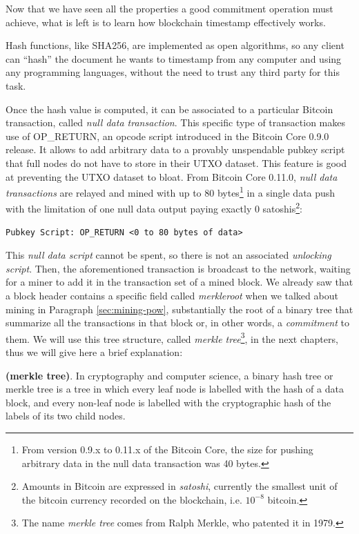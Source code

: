 \bigskip
\noindent
Now that we have seen all the properties a good commitment operation must achieve, what is left is to learn how blockchain timestamp effectively works.

\bigskip
\noindent
Hash functions, like SHA256, are implemented as open algorithms, so any client can \enquote{hash} the document he wants to timestamp from any computer and using any programming languages, without the need to trust any third party for this task.

\bigskip
\noindent
Once the hash value is computed, it can be associated to a particular Bitcoin transaction, called \textit{null data transaction}. This specific type of transaction makes use of OP\_RETURN, an opcode script introduced in the Bitcoin Core 0.9.0 release. It allows to add arbitrary data to a provably unspendable pubkey script that full nodes do not have to store in their UTXO dataset. This feature is good at preventing the UTXO dataset to bloat. From Bitcoin Core 0.11.0, \textit{null data transactions} are relayed and mined with up to 80 bytes\footnote{From version 0.9.x to 0.11.x of the Bitcoin Core, the size for pushing arbitrary data in the null data transaction was 40 bytes.} in a single data push with the limitation of one null data output paying exactly 0 satoshis\footnote{Amounts in Bitcoin are expressed in \textit{satoshi}, currently the smallest unit of the bitcoin currency recorded on the blockchain, i.e. $10^{-8}$ bitcoin.}: 
\begin{verbatim}
Pubkey Script: OP_RETURN <0 to 80 bytes of data>
\end{verbatim}
This \textit{null data script} cannot be spent, so there is not an associated \textit{unlocking script}. Then, the aforementioned transaction is broadcast to the network, waiting for a miner to add it in the transaction set of a mined block. We already saw that a block header contains a specific field called \textit{merkleroot} when we talked about mining in Paragraph \ref{sec:mining-pow}, substantially the root of a binary tree that summarize all the transactions in that block or, in other words, a \textit{commitment} to them. We will use this tree structure, called \textit{merkle tree}\textup{\footnote{The name \textit{merkle tree} comes from Ralph Merkle, who patented it in 1979.}}, in the next chapters, thus we will give here a brief explanation:

\begin{mydef}{\bf (merkle tree)}.
    \label{def:merkle}
    In cryptography and computer science, a binary hash tree or merkle tree is a tree in which every leaf node is labelled with the hash of a data block, and every non-leaf node is labelled with the cryptographic hash of the labels of its two child nodes.
\end{mydef}

